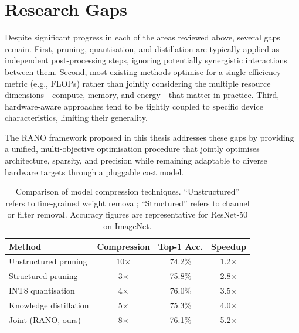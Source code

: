 \section{Research Gaps}

Despite significant progress in each of the areas reviewed above,
several gaps remain. First, pruning, quantisation, and distillation are
typically applied as independent post-processing steps, ignoring
potentially synergistic interactions between them. Second, most existing
methods optimise for a single efficiency metric (e.g., FLOPs) rather
than jointly considering the multiple resource dimensions---compute,
memory, and energy---that matter in practice. Third, hardware-aware
approaches tend to be tightly coupled to specific device
characteristics, limiting their generality.

The RANO framework proposed in this thesis addresses these gaps by
providing a unified, multi-objective optimisation procedure that
jointly optimises architecture, sparsity, and precision while remaining
adaptable to diverse hardware targets through a pluggable cost model.

\begin{table}[htbp]
\centering
\caption{Comparison of model compression techniques. ``Unstructured''
refers to fine-grained weight removal; ``Structured'' refers to channel
or filter removal. Accuracy figures are representative for ResNet-50 on
ImageNet.}
\label{tab:compression}
\begin{tabular}{@{}lccc@{}}
\toprule
\textbf{Method} & \textbf{Compression} & \textbf{Top-1 Acc.} & \textbf{Speedup} \\
\midrule
Unstructured pruning    & 10$\times$ & 74.2\% & 1.2$\times$ \\
Structured pruning      & 3$\times$  & 75.8\% & 2.8$\times$ \\
INT8 quantisation       & 4$\times$  & 76.0\% & 3.5$\times$ \\
Knowledge distillation  & 5$\times$  & 75.3\% & 4.0$\times$ \\
Joint (RANO, ours)      & 8$\times$  & 76.1\% & 5.2$\times$ \\
\bottomrule
\end{tabular}
\end{table}

\newpage


